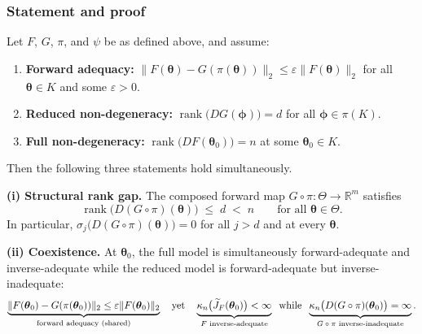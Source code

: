 \subsubsection{Statement and proof}

\begin{theorem}
\label{thm:p10_forward_inverse_gap}
Let $F$, $G$, $\pi$, and $\psi$ be as defined above, and assume:
\begin{enumerate}
  \renewcommand{\labelenumi}{(A\arabic{enumi})}
  \item \textbf{Forward adequacy:}
    $\|F(\boldsymbol{\theta})-G(\pi(\boldsymbol{\theta}))\|_2
    \leq\varepsilon\|F(\boldsymbol{\theta})\|_2$
    for all $\boldsymbol{\theta}\in K$ and some $\varepsilon>0$.
  \item \textbf{Reduced non-degeneracy:}
    $\operatorname{rank}\bigl(DG(\boldsymbol{\phi})\bigr)=d$
    for all $\boldsymbol{\phi}\in\pi(K)$.
  \item \textbf{Full non-degeneracy:}
    $\operatorname{rank}\bigl(DF(\boldsymbol{\theta}_0)\bigr)=n$
    at some $\boldsymbol{\theta}_0\in K$.
\end{enumerate}
Then the following three statements hold simultaneously.

\medskip
\noindent\textbf{(i) Structural rank gap.}
The composed forward map $G\circ\pi:\Theta\to\mathbb{R}^m$ satisfies
\begin{equation}
  \operatorname{rank}\bigl(D(G\circ\pi)(\boldsymbol{\theta})\bigr)
  \;\leq\; d \;< \;n
  \qquad\text{for all } \boldsymbol{\theta}\in\Theta.
  \label{eq:thm4_rank_gap}
\end{equation}
In particular, $\sigma_j\bigl(D(G\circ\pi)(\boldsymbol{\theta})\bigr)=0$
for all $j>d$ and at every $\boldsymbol{\theta}$.

\medskip
\noindent\textbf{(ii) Coexistence.}
At $\boldsymbol{\theta}_0$, the full model is simultaneously forward-adequate
and inverse-adequate while the reduced model is forward-adequate but
inverse-inadequate:
\begin{equation}
  \underbrace{%
    \|F(\boldsymbol{\theta}_0)-G(\pi(\boldsymbol{\theta}_0))\|_2
    \leq\varepsilon\|F(\boldsymbol{\theta}_0)\|_2
  }_{\text{forward adequacy (shared)}}
  \quad\text{yet}\quad
  \underbrace{%
    \kappa_n\bigl(\widetilde{J}_F(\boldsymbol{\theta}_0)\bigr)<\infty
  }_{\text{$F$ inverse-adequate}}
  \;\;\text{while}\;\;
  \underbrace{%
    \kappa_n\bigl(D(G\circ\pi)(\boldsymbol{\theta}_0)\bigr)=\infty
  }_{\text{$G\circ\pi$ inverse-inadequate}}.
  \label{eq:thm4_coexistence}
\end{equation}


\end{theorem}
